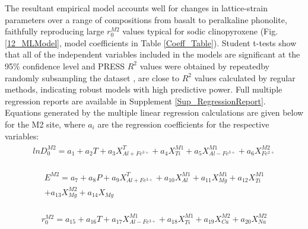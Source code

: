\documentclass[final,authoryear,3p,times,twocolumn]{elsarticle}
\begin{document}
	The resultant empirical model accounts well for changes in lattice-strain parameters over a range of compositions from basalt to peralkaline phonolite, faithfully reproducing large $r_0^{M2}$ values typical for sodic clinopyroxene (Fig. \ref{12_MLModel}, model coefficients in Table \ref{Coeff_Table}). Student t-tests show that all of the independent variables included in the models are significant at the 95\% confidence level and PRESS $R^2$ values were obtained by repeatedby randomly subsampling the dataset \citep{Stevens1996}, are close to $R^2$ values calculated by regular methods, indicating robust models with high predictive power. Full multiple regression reports are available in Supplement \ref{Sup_RegressionReport}. Equations generated by the multiple linear regression calculations are given below for the M2 site, where $a_i$ are the regression coefficients for the respective variables: \\
	
		\begin{align} %
	\begin{split}
   lnD^{M2}_0 = a_1 + a_2T + a_3X^{T}_{Al + Fe^{3+}} + a_4X^{M1}_{Ti} + a_5X^{M1}_{Al - Fe^{3+}} + a_6X^{M2}_{Fe^{2+}}
   	\end{split}
	\label{D0M2_eqn}
	\end{align}
	
	\begin{align} %
	\begin{split}
	E^{M2} = a_7 + a_8P + a_9X^{T}_{Al + Fe^{3+}} + a_{10}X^{M1}_{Al} + a_{11}X^{M1}_{Mg} + a_{12}X^{M1}_{Ti} \\ + a_{13}X^{M2}_{Mg} + a_{14}X_{Mg}
	\end{split}
	\label{EM2_eqn}
	\end{align}
	
	\begin{align} %
	\begin{split}
	r^{M2}_0 = a_{15} + a_{16}T + a_{17}X^{M1}_{Al - Fe^{3+}} + a_{18}X^{M1}_{Ti} + a_{19}X^{M2}_{Ca} + a_{20}X^{M2}_{Na}
	\end{split}
	\label{r0M2_eqn}
	\end{align}
	   
\end{document}
